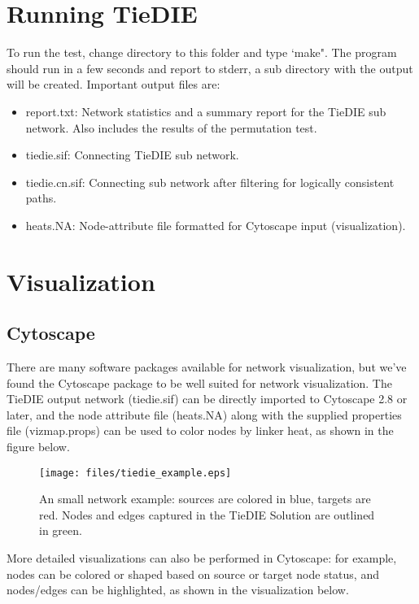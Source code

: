 \documentclass[11pt]{report}
\begin{document}
\section{Running TieDIE}

\noindent To run the test, change directory to this folder and type `make". The program should run in a few seconds and report 
to stderr, a sub directory with the output will be created. Important output files are:

	\begin{itemize}
	\item report.txt: Network statistics and a summary report for the TieDIE sub network. Also includes the results of the 
	permutation test. 
	\item tiedie.sif: Connecting TieDIE sub network.
	\item tiedie.cn.sif: Connecting sub network after filtering for logically consistent paths. 
	\item heats.NA: Node-attribute file formatted for Cytoscape input (visualization). 
	\end{itemize}

\section{Visualization}

\subsection{Cytoscape}

\noindent There are many software packages available for network visualization, but we've found the Cytoscape package \cite{Cytoscape03} to be well suited for network visualization. The TieDIE output network (tiedie.sif) can be directly imported to Cytoscape 2.8 or later, and the node attribute file (heats.NA) along with the supplied properties file (vizmap.props) can be used to color nodes by linker heat, as shown in the figure below.

\begin{figure}[h]
    \texttt{[image: files/tiedie\_example.eps]}
	\caption{An small network example: sources are colored in blue, targets are red. Nodes and edges captured in the TieDIE Solution are outlined in green.}
    \label{fig:toy_network}
\end{figure}

\clearpage

More detailed visualizations can also be performed in Cytoscape: for example, nodes can be colored or shaped based on source or
target node status, and nodes/edges can be highlighted, as shown in the visualization below. 
\end{document}
